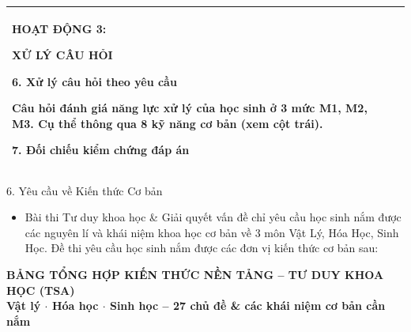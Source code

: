 \documentclass[12pt,a4paper,twoside]{article}
\begin{document}
{\begin{longtable}{|>{\raggedright\arraybackslash}p{}|>{\raggedright\arraybackslash}p{}|}
\textbf{\textcolor{sectionMid}{HOẠT ĐỘNG 3:}}\par
\textbf{\textcolor{sectionMid}{XỬ LÝ CÂU HỎI}}\par\vspace{1pt}
\textbf{6. Xử lý câu hỏi theo yêu cầu}\par
Câu hỏi đánh giá năng lực xử lý của học sinh ở 3 mức M1, M2, M3. Cụ thể thông qua 8 kỹ năng cơ bản (xem cột trái).\par\vspace{1pt}
\textbf{7. Đối chiếu kiểm chứng đáp án}
\\
\hline
\end{longtable}
}
\setlength{\tabcolsep}{6pt}

\newpage

\begin{sectionheader}{6. Yêu cầu về Kiến thức Cơ bản}
\begin{itemize}[leftmargin=*, itemsep=3pt, label=\textcolor{accentBlue}{\textbf{--}}]
\item Bài thi Tư duy khoa học \& Giải quyết vấn đề chỉ yêu cầu học sinh nắm được các nguyên lí và khái niệm khoa học cơ bản về 3 môn Vật Lý, Hóa Học, Sinh Học. Đề thi yêu cầu học sinh nắm được các đơn vị kiến thức cơ bản sau:
\end{itemize}
\end{sectionheader}
\vspace{2pt}

\begin{center}
{\Large\textcolor{primaryBlue}{\textbf{BẢNG TỔNG HỢP KIẾN THỨC NỀN TẢNG -- TƯ DUY KHOA HỌC (TSA)}}}\\[4pt]
{\large\textcolor{secondaryBlue}{\textbf{Vật lý $\cdot$ Hóa học $\cdot$ Sinh học -- 27 chủ đề \& các khái niệm cơ bản cần nắm}}}
\end{center}
\vspace{8pt}
\end{document}
